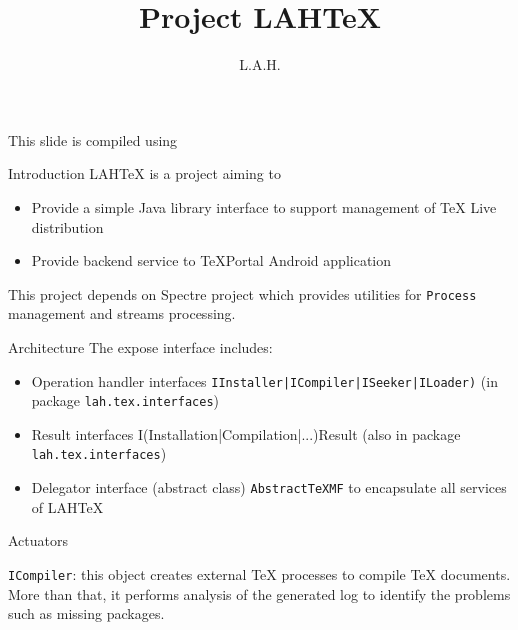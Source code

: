 \documentclass{beamer}
\title{Project LAHTeX}
\author{L.A.H.}
\begin{document}
\begin{frame}
\titlepage
\begin{center}
\scriptsize{This slide is compiled using \TeXPortal}
\end{center}
\end{frame}

\begin{frame}[fragile]{Introduction}
LAHTeX is a project aiming to
\begin{itemize}
\item Provide a simple Java library interface to support management of TeX Live distribution
\item Provide backend service to TeXPortal Android application
\end{itemize}
This project depends on Spectre project which provides utilities for \verb/Process/ management and streams processing.
\end{frame}

\begin{frame}[fragile]{Architecture}
The expose interface includes:
\begin{itemize}
\item Operation handler interfaces \verb/IInstaller|ICompiler|ISeeker|ILoader)/ (in package \verb/lah.tex.interfaces/)
\item Result interfaces I(Installation|Compilation|...)Result (also in package \verb/lah.tex.interfaces/)
\item Delegator interface (abstract class) \verb/AbstractTeXMF/ to encapsulate all services of LAHTeX 
\end{itemize}
\end{frame}

\begin{frame}[fragile]{Actuators}
\item \verb/ICompiler/: this object creates external TeX processes to compile TeX documents. More than that, it performs analysis of the generated log to identify the problems such as missing packages. 
\end{frame}
\end{document}
